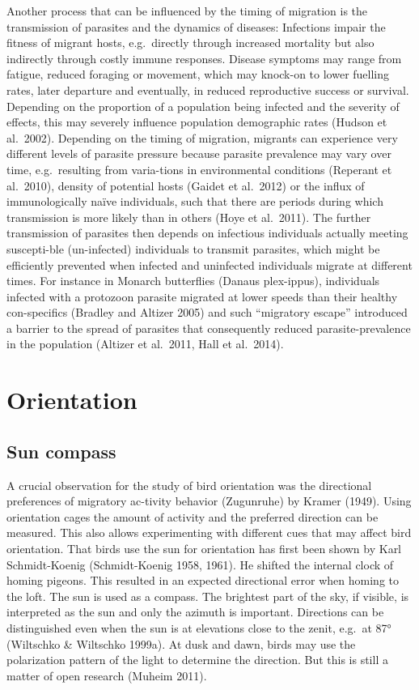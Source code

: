 \documentclass[
]{book}
\begin{document}
Another process that can be influenced by the timing of migration is the transmission of parasites and the dynamics of diseases: Infections impair the fitness of migrant hosts, e.g.~directly through increased mortality but also indirectly through costly immune responses. Disease symptoms may range from fatigue, reduced foraging or movement, which may knock-on to lower fuelling rates, later departure and eventually, in reduced reproductive success or survival. Depending on the proportion of a population being infected and the severity of effects, this may severely influence population demographic rates (Hudson et al.~2002). Depending on the timing of migration, migrants can experience very different levels of parasite pressure because parasite prevalence may vary over time, e.g.~resulting from varia-tions in environmental conditions (Reperant et al.~2010), density of potential hosts (Gaidet et al.~2012) or the influx of immunologically naïve individuals, such that there are periods during which transmission is more likely than in others (Hoye et al.~2011).
The further transmission of parasites then depends on infectious individuals actually meeting suscepti-ble (un-infected) individuals to transmit parasites, which might be efficiently prevented when infected and uninfected individuals migrate at different times. For instance in Monarch butterflies (Danaus plex-ippus), individuals infected with a protozoon parasite migrated at lower speeds than their healthy con-specifics (Bradley and Altizer 2005) and such ``migratory escape'' introduced a barrier to the spread of parasites that consequently reduced parasite-prevalence in the population (Altizer et al.~2011, Hall et al.~2014).

\hypertarget{orientation}{%
\chapter{Orientation}\label{orientation}}

\hypertarget{sun-compass}{%
\section{Sun compass}\label{sun-compass}}

A crucial observation for the study of bird orientation was the directional preferences of migratory ac-tivity behavior (Zugunruhe) by Kramer (1949). Using orientation cages the amount of activity and the preferred direction can be measured. This also allows experimenting with different cues that may affect bird orientation.
That birds use the sun for orientation has first been shown by Karl Schmidt-Koenig (Schmidt-Koenig 1958, 1961). He shifted the internal clock of homing pigeons. This resulted in an expected directional error when homing to the loft. The sun is used as a compass. The brightest part of the sky, if visible, is interpreted as the sun and only the azimuth is important. Directions can be distinguished even when the sun is at elevations close to the zenit, e.g.~at 87° (Wiltschko \& Wiltschko 1999a).
At dusk and dawn, birds may use the polarization pattern of the light to determine the direction. But this is still a matter of open research (Muheim 2011).
\end{document}
